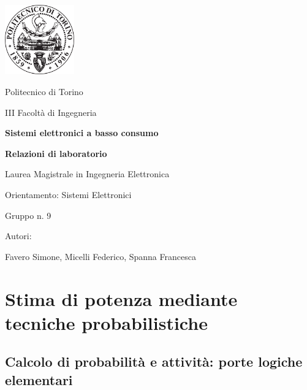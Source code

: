 \documentclass[11pt,  english, makeidx, a4paper, titlepage, oneside]{book}
\begin{document}
\begin{titlepage}

	\centerline{\includegraphics[width=3cm]{./img/general/polito.png}}
	\vspace{0.3cm}
	\centerline{\Large{Politecnico di Torino}}
	\vspace{0.3cm}
	\centerline{\Large{III Facoltà di Ingegneria}}
	\vspace{3cm}
	\centerline{\Huge\textbf{Sistemi elettronici a basso consumo}}
	\vspace{1cm}
	\centerline{\LARGE\textbf{Relazioni di laboratorio}}
	\vspace{3cm}
	\centerline{\LARGE{Laurea Magistrale in Ingegneria Elettronica}}
	\vspace{0.3cm}
	\centerline{\LARGE{Orientamento: Sistemi Elettronici}}
	\vspace{3cm}
	\centerline{\Large{Gruppo n. 9}}
	\vspace{2cm}
	\centerline{\Large{Autori:}}
	\vspace{0.3cm}
	\centerline{\Large{Favero Simone, Micelli Federico, Spanna Francesca}}
	
\end{titlepage}

\tableofcontents %
\pagebreak %

\chapter{Stima di potenza mediante tecniche probabilistiche}

\section{Calcolo di probabilità e attività: porte logiche elementari}
\end{document}
